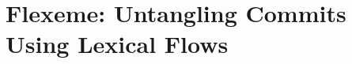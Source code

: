 \chapter[Flexeme: Untangling Commits Using Lexical Flows]{Flexeme: Untangling Commits\\Using Lexical Flows}
\label{chapter:flexeme}


\newcommand{\ourapproach}{\textsc{flexeme}\xspace}
\newcommand{\Ourapproach}{\textsc{Flexeme}\xspace}
\renewcommand{\ourtool}{\textsc{heddle}\xspace}
\renewcommand{\Ourtool}{\textsc{Heddle}\xspace}
\newcommand{\projURL}{\url{https://github.com/PPPI/Flexeme}\xspace}

\newcommand{\Ouraccuracy}{$0.81$\xspace}
\newcommand{\Ouraccuracyhigh}{$0.84$\xspace}
\newcommand{\OuraccuracyhighProject}{Nancy\xspace}
\newcommand{\Ourspeedup}{$32$\xspace}
\newcommand{\OurslowdownBarnett}{$9$\xspace}
\newcommand{\Ourabsolutespeedup}{$3'10''$\xspace}
\newcommand{\Ourruntime}{ten seconds\xspace}
\newcommand{\OurtoolsAtomicAccuracy}{$0.63$\xspace}
\newcommand{\OurtoolsAtomicLabelAccuracy}{$0.93$\xspace}

\newcommand{\OurtoolVsHerzigAccuracy}{$0.14$\xspace}
\newcommand{\BarnettAccuracy}{$0.13$\xspace}
\newcommand{\HerzigConceptAccuracyDrop}{$0.07$\xspace}

\newcommand{\OurtoolsScalabilityRegression}{$t = 0.3371 - 0.0041 n + 0.0015 n^2$, $R^2=1.00$\xspace}
\newcommand{\HerzigScalabilityRegression}{$t = 0.8794 - 0.0528 n + 0.0019 n^2$, $R^2=0.99$\xspace}
\newcommand{\SpeedGainAtScale}{$68$ seconds\xspace}

\newcommand{\HerzigDeltaOurtoolAccuracy}{$p<0.001$\xspace}
\newcommand{\HerzigDeltaOurtoolTime}{$p=0.51$\xspace}
\newcommand{\BarnettConceptsAccuracy}{$p < 0.01$\xspace}
\newcommand{\HerzigConceptsAccuracy}{$p=0.28$\xspace}
\newcommand{\OurtoolConceptsAccuracy}{$p=0.76$\xspace}


